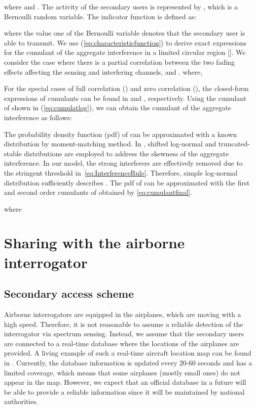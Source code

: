 \documentclass[12pt,submission,journal,onecolumn]{IEEEtran}
\begin{document}
where  and . The activity of the secondary users is represented by , which is a Bernoulli random variable. The indicator function is defined as:

where the value one of the Bernoulli variable denotes that the secondary user is able to transmit. We use (\ref{eq:characteristicfunction}) to derive exact expressions for the  cumulant of the aggregate interference in a limited circular region []. We consider the case where there is a partial correlation between the two fading effects affecting the sensing and interfering channels,  and .
where,




For the special cases of full correlation () and zero correlation (), the closed-form expressions of cumulants can be found in \cite{gs0801} and \cite{5701700}, respectively. Using the cumulant of  shown in (\ref{eq:cumulatlog}), we can obtain the  cumulant of the aggregate interference  as follows:


The probability density function (pdf) of  can be approximated with a known distribution by moment-matching method. In \cite{gs0801,5701700}, shifted log-normal and truncated-stable distributions are employed to address the skewness of the aggregate interference. In our model, the strong interferers are effectively removed due to the stringent threshold in~\eqref{eq:InterferenceRule}. Therefore, simple log-normal distribution sufficiently describes . The pdf of  can be approximated with the first and second order cumulants of  obtained by \eqref{eq:cumulantfinal}.


where



\section{Sharing with the airborne interrogator}
\label{sec:interferenceAirborne}

\subsection{Secondary access scheme}
\label{subsec:AirborneScheme}
Airborne interrogators are equipped in the airplanes, which are moving with a high speed. Therefore, it is not reasonable to assume a reliable detection of the interrogator via spectrum sensing. Instead, we assume that the secondary users are connected to a real-time database where the locations of the airplanes are provided. A living example of such a real-time aircraft location map can be found in \cite{misc:RDB}. Currently, the database information is updated every 20-60 seconds and has a limited coverage, which means that some airplanes (mostly small ones) do not appear in the map. However, we expect that an official database in a future will be able to provide a reliable information since it will be maintained by national authorities.
\end{document}
